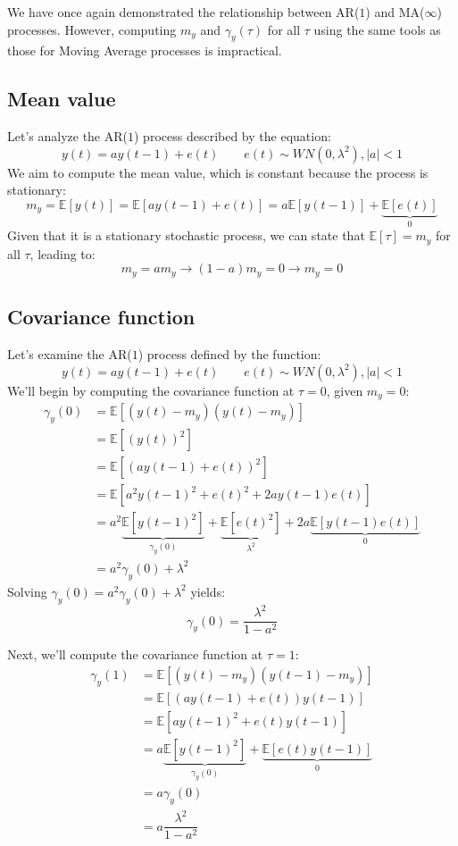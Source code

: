 We have once again demonstrated the relationship between AR($1$) and MA($\infty$) processes. 
However, computing $m_y$ and $\gamma_y(\tau)$ for all $\tau$ using the same tools as those for Moving Average processes is impractical.

\subsection{Mean value}
Let's analyze the AR($1$) process described by the equation:
\[y(t)=ay(t-1)+e(t) \qquad e(t)\sim WN(0,\lambda^2),\left\lvert a \right\rvert<1\]
We aim to compute the mean value, which is constant because the process is stationary:
\[m_y=\mathbb{E}\left[y(t)\right]=\mathbb{E}\left[ay(t-1)+e(t)\right]=a\mathbb{E}\left[y(t-1)\right]+\underbrace{\mathbb{E}\left[e(t)\right]}_0\]
Given that it is a stationary stochastic process, we can state that  $\mathbb{E}\left[\tau\right]=m_y$ for all $\tau$, leading to:
\[m_y=am_y\rightarrow (1-a)m_y=0\rightarrow m_y=0\]

\subsection{Covariance function}
Let's examine the AR($1$) process defined by the function:
\[y(t)=ay(t-1)+e(t) \qquad e(t)\sim WN(0,\lambda^2),\left\lvert a \right\rvert<1\]
We'll begin by computing the covariance function at $\tau=0$, given $m_y=0$:
\begin{align*}
    \gamma_y(0) &=\mathbb{E}\left[ \left(y(t)-m_y\right)\left(y(t)-m_y\right) \right] \\
                &=\mathbb{E}\left[ {\left(y(t)\right)}^2 \right] \\
                &=\mathbb{E}\left[ {\left(ay(t-1)+e(t)\right)}^2 \right] \\      
                &=\mathbb{E}\left[ a^2{y(t-1)}^2+{e(t)}^2+2ay(t-1)e(t) \right] \\     
                &=a^2\underbrace{\mathbb{E}\left[ {y(t-1)}^2\right]}_{\gamma_y(0)} +\underbrace{\mathbb{E}\left[{e(t)}^2\right]}_{\lambda^2} +2a\underbrace{\mathbb{E}\left[y(t-1)e(t)\right]}_{0}  \\    
                &=a^2\gamma_y(0) +\lambda^2 
\end{align*}
Solving $\gamma_y(0)=a^2\gamma_y(0) +\lambda^2$ yields:
\[\gamma_y(0)=\dfrac{\lambda^2}{1-a^2}\]

Next, we'll compute the covariance function at $\tau=1$:
\begin{align*}
    \gamma_y(1) &=\mathbb{E}\left[ \left(y(t)-m_y\right)\left(y(t-1)-m_y\right) \right] \\
                &=\mathbb{E}\left[ \left(ay(t-1)+e(t)\right)y(t-1) \right] \\
                &=\mathbb{E}\left[ a{y(t-1)}^2+e(t)y(t-1) \right] \\     
                &=a\underbrace{\mathbb{E}\left[ {y(t-1)}^2\right]}_{\gamma_y(0)} +\underbrace{\mathbb{E}\left[ e(t)y(t-1) \right]}_0  \\  
                &=a\gamma_y(0) \\
                &=a\dfrac{\lambda^2}{1-a^2}
\end{align*}

